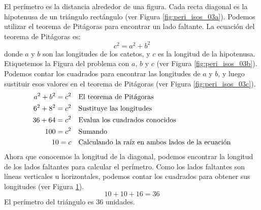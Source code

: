 \begin{solutionbox}{14cm}
\begin{minipage}{0.4\textwidth}
\begin{multicols}{2}
\begin{figure}[H]
                \caption{}
                \label{fig:peri_isos_03d}
            \end{figure}
        \end{multicols}
    \end{minipage}\hfill
    \begin{minipage}{0.55\textwidth}
        El perímetro es la distancia alrededor de una figura.
        Cada recta diagonal es la hipotenusa de un triángulo rectángulo (ver Figura \ref{fig:peri_isos_03a}).
        Podemos utilizar el teorema de Pitágoras para encontrar un lado faltante.
        La ecuación del teorema de Pitágoras es:
        \[c^2=a^2+b^2\]
        donde $a$ y $b$ son las longitudes de los catetos, y $c$ es la longitud de la hipotenusa.
        Etiquetemos la Figura del problema con $a$, $b$ y $c$ (ver Figura \ref{fig:peri_isos_03b}).
        Podemos contar los cuadrados para encontrar las longitudes de $a$ y $b$, y luego sustituir esos valores en el teorema de Pitágoras (ver Figura \ref{fig:peri_isos_03c}).
        \begin{align*}
            a^2+b^2  =c^2 & \text{\quad El teorema de Pitágoras}                          \\
            6^2+8^2  =c^2 & \text{\quad Sustituye las longitudes}                         \\
            36 +64 =c^2   & \text{\quad Evalua los cuadrados conocidos}                   \\
            100=c^2       & \text{\quad Sumando }                                         \\
            10=c          & \text{\quad Calculando la raíz en ambos lados de la ecuación} \\
        \end{align*}
        Ahora que conocemos la longitud de la diagonal, podemos encontrar la longitud de los lados faltantes para calcular el perímetro.
        Como los lados faltantes son líneas verticales u horizontales, podemos contar los cuadrados para obtener sus longitudes (ver Figura \ref{fig:peri_isos_03d}).
        \[10+10+16=36\]
        El perímetro del triángulo es 36 unidades.
    \end{minipage}
\end{solutionbox}
